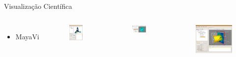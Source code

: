 \documentclass[12pt,t,graphics]{beamer}
\begin{document}
\begin{frame}[t]{Visualização Científica}
	\begin{columns}
		\begin{itemize}
			\item MayaVi
		\end{itemize}
		\begin{figure}
			\centering
			\includegraphics[scale=0.25]{img/mayavi-boy.png}
		\end{figure}
		\vspace{-0.5cm}
		\begin{figure}
			\centering
			\includegraphics[scale=0.4]{img/mayavi-ipython.png}
		\end{figure}
		\begin{figure}
			\centering
			\includegraphics[scale=0.2]{img/heart.jpg}

\end{figure}
\end{columns}
\end{frame}
\end{document}
